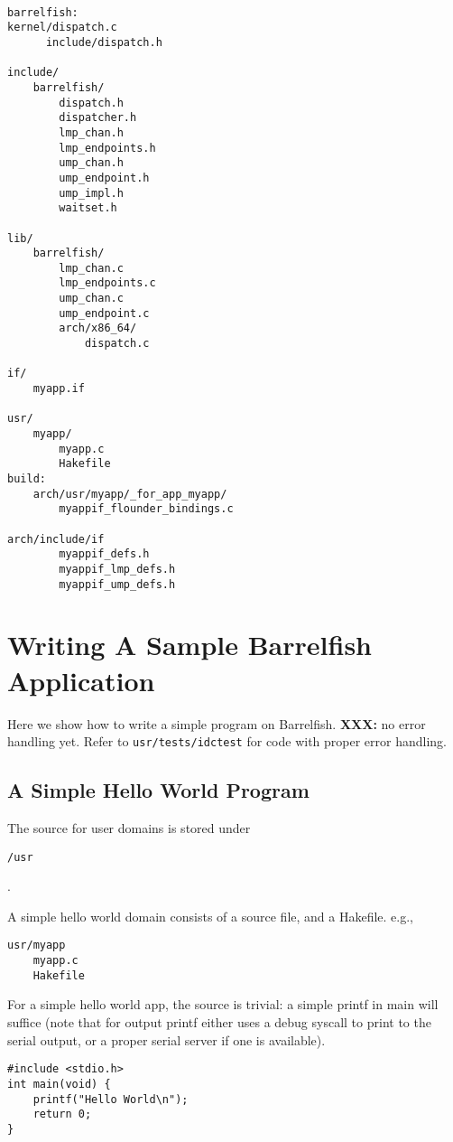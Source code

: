 \documentclass[a4paper,twoside]{report} %
\begin{document}
\begin{verbatim}

barrelfish:
kernel/dispatch.c
      include/dispatch.h

include/
    barrelfish/
        dispatch.h
        dispatcher.h
        lmp_chan.h
        lmp_endpoints.h
        ump_chan.h
        ump_endpoint.h
        ump_impl.h
        waitset.h

lib/
    barrelfish/
        lmp_chan.c
        lmp_endpoints.c
        ump_chan.c
        ump_endpoint.c
        arch/x86_64/
            dispatch.c 

if/
    myapp.if

usr/
    myapp/
        myapp.c
        Hakefile
build:
    arch/usr/myapp/_for_app_myapp/ 
        myappif_flounder_bindings.c

arch/include/if
        myappif_defs.h
        myappif_lmp_defs.h
        myappif_ump_defs.h

\end{verbatim}


\section{Writing A Sample Barrelfish Application}

Here we show how to write a simple program on Barrelfish.  \textbf{XXX:} no
error handling yet.  Refer to \texttt{usr/tests/idctest} for code with proper
error handling.

\subsection{A Simple Hello World Program}

The source for user domains is stored under \begin{verbatim}/usr\end{verbatim}. 

A simple hello world domain consists of a source file, and a Hakefile. e.g.,
\begin{verbatim}
usr/myapp
    myapp.c
    Hakefile
\end{verbatim}

For a simple hello world app, the source is trivial: a simple printf in main
will suffice (note that for output printf either uses a debug syscall to print
to the serial output, or a proper serial server if one is available).

\begin{verbatim}
#include <stdio.h> 
int main(void) {
    printf("Hello World\n");
    return 0;
}
\end{verbatim}
\end{document}

